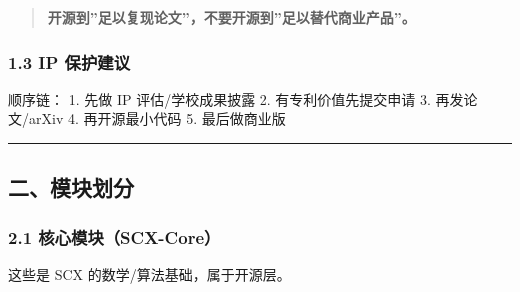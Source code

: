 \documentclass[
  12pt,
]{ctexart}
\begin{document}
\begin{quote}
\textbf{开源到''足以复现论文''，不要开源到''足以替代商业产品''。}
\end{quote}

\subsubsection{1.3 IP 保护建议}\label{ip-ux4fddux62a4ux5efaux8bae}

顺序链： 1. 先做 IP 评估/学校成果披露 2. 有专利价值先提交申请 3.
再发论文/arXiv 4. 再开源最小代码 5. 最后做商业版

\begin{center}\rule{0.5\linewidth}{0.5pt}\end{center}

\subsection{二、模块划分}\label{ux4e8cux6a21ux5757ux5212ux5206}

\subsubsection{2.1
核心模块（SCX-Core）}\label{ux6838ux5fc3ux6a21ux5757scx-core}

这些是 SCX 的数学/算法基础，属于开源层。
\end{document}
